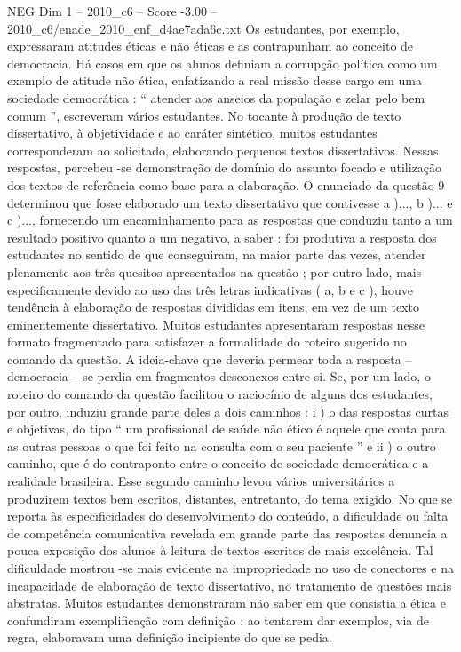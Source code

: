 \begin{textsample}{NEG Dim 1 – 2010\_c6 – Score -3.00 – 2010\_c6/enade\_2010\_enf\_d4ae7ada6c.txt}
Os estudantes, por exemplo, expressaram atitudes éticas e não éticas e as contrapunham ao conceito de democracia.
Há casos em que os alunos definiam a corrupção política como um exemplo de atitude não ética, enfatizando a real missão desse cargo em uma sociedade democrática : “ atender aos anseios da população e zelar pelo bem comum ”, escreveram vários estudantes.
No tocante à produção de texto dissertativo, à objetividade e ao caráter sintético, muitos estudantes corresponderam ao solicitado, elaborando pequenos textos dissertativos.
Nessas respostas, percebeu -se demonstração de domínio do assunto focado e utilização dos textos de referência como base para a elaboração.
O enunciado da questão 9 determinou que fosse elaborado um texto dissertativo que contivesse a )..., b )... e c )..., fornecendo um encaminhamento para as respostas que conduziu tanto a um resultado positivo quanto a um negativo, a saber : foi produtiva a resposta dos estudantes no sentido de que conseguiram, na maior parte das vezes, atender plenamente aos três quesitos apresentados na questão ; por outro lado, mais especificamente devido ao uso das três letras indicativas ( a, b e c ), houve tendência à elaboração de respostas divididas em itens, em vez de um texto eminentemente dissertativo.
Muitos estudantes apresentaram respostas nesse formato fragmentado para satisfazer a formalidade do roteiro sugerido no comando da questão.
A ideia-chave que deveria permear toda a resposta – democracia – se perdia em fragmentos desconexos entre si.
Se, por um lado, o roteiro do comando da questão facilitou o raciocínio de alguns dos estudantes, por outro, induziu grande parte deles a dois caminhos : i ) o das respostas curtas e objetivas, do tipo “ um profissional de saúde não ético é aquele que conta para as outras pessoas o que foi feito na consulta com o seu paciente ” e ii ) o outro caminho, que é do contraponto entre o conceito de sociedade democrática e a realidade brasileira.
Esse segundo caminho levou vários universitários a produzirem textos bem escritos, distantes, entretanto, do tema exigido.
No que se reporta às especificidades do desenvolvimento do conteúdo, a dificuldade ou falta de competência comunicativa revelada em grande parte das respostas denuncia a pouca exposição dos alunos à leitura de textos escritos de mais excelência.
Tal dificuldade mostrou -se mais evidente na impropriedade no uso de conectores e na incapacidade de elaboração de texto dissertativo, no tratamento de questões mais abstratas.
Muitos estudantes demonstraram não saber em que consistia a ética e confundiram exemplificação com definição : ao tentarem dar exemplos, via de regra, elaboravam uma definição incipiente do que se pedia.

\end{textsample}

